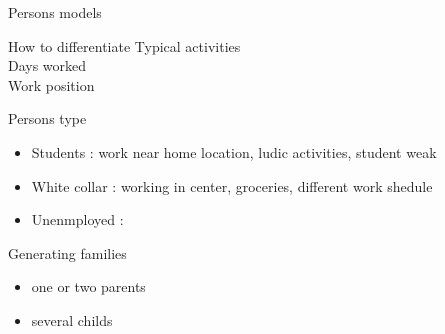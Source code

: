 \begin{frame}{Persons models}
\begin{block}{How to differentiate}
Typical activities\\
Days worked \\
Work position
\end{block}

\begin{alertblock}{Persons type}
\begin{itemize}
\item Students : work near home location, ludic activities, student weak
\item White collar : working in center, groceries, different work shedule
\item Unenmployed : 
\end{itemize}

\end{alertblock}


\end{frame}


\begin{frame}{Generating families}
\begin{itemize}
\item one or two parents
\item several childs
\end{itemize}
\end{frame}